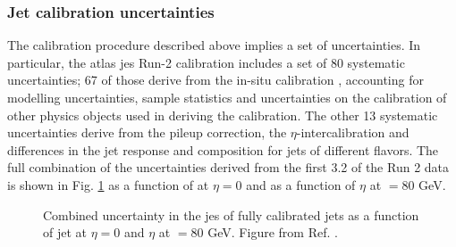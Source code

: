 \subsubsection*{Jet calibration uncertainties}

The calibration procedure described above implies a set of uncertainties. In particular, 
the \gls{atlas} \gls{jes} Run-2 calibration includes a set of 80 systematic uncertainties; 
67 of those derive from the in-situ calibration \cite{PhysRevD.96.072002}, accounting for modelling uncertainties, 
sample statistics and uncertainties on the calibration of other physics objects used in deriving the calibration. 
The other 13 systematic uncertainties derive from the pileup correction, the $\eta$-intercalibration 
and differences in the jet response and composition for jets of different flavors. 
The full combination of the uncertainties derived from the first 3.2 \ifb of the Run 2 data 
is shown in Fig. \ref{fig:obj:jessyst} as a function of \pt at $\eta = 0$ and as a function of $\eta$ at \pt$ = 80$ GeV.

\begin{figure}[h]
\begin{center}
\end{center}
 \caption{Combined uncertainty in the \gls{jes} of fully calibrated jets as a function of   
 jet \pt at $\eta = 0$ and  $\eta$ at \pt$ = 80$ GeV. Figure from Ref. \cite{PhysRevD.96.072002}.}
  \label{fig:obj:jessyst}
\end{figure}

